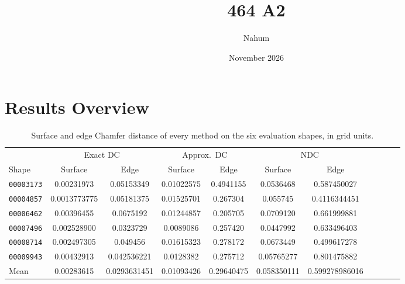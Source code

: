 \documentclass[12pt,letterpaper]{article}
\title{464 A2}
\author{Nahum }
\date{November 2026}
\begin{document}
\section*{Results Overview}

\begin{table}[h]
      \centering
      \footnotesize
      \setlength{\tabcolsep}{5pt}
      \caption{Surface and edge Chamfer distance of every method on the six evaluation shapes, in grid units.}
      \label{tab:overview}
      \begin{tabular}{lcccccccccc}
            \toprule
                              & \multicolumn{2}{c}{Exact DC} & \multicolumn{2}{c}{Approx.\ DC} & \multicolumn{2}{c}{NDC}                                          \\
            \cmidrule(lr){2-3} \cmidrule(lr){4-5} \cmidrule(lr){6-7} 
            Shape             & Surface                      & Edge                            & Surface                 & Edge                    & Surface                        & Edge  \\
            \midrule
            \texttt{00003173} &0.00231973&0.05153349&0.01022575&0.4941155&0.0536468&0.587450027\\
            \texttt{00004857} &0.0013773775&0.05181375&0.01525701&0.267304&0.055745&0.4116344451\\
            \texttt{00006462} &0.00396455&0.0675192&0.01244857&0.205705&0.0709120&0.661999881\\
            \texttt{00007496} &0.002528900&0.0323729&0.0089086&0.257420&0.0447992&0.633496403\\
            \texttt{00008714} &0.002497305& 0.049456&0.01615323&0.278172&0.0673449&0.499617278\\
            \texttt{00009943} &0.00432913&0.042536221& 0.0128382&0.275712&0.05765277&0.801475882\\
            \midrule
            Mean              &0.00283615&0.0293631451&0.01093426&0.29640475&0.058350111&0.599278986016&         &      &         &      \\
            \bottomrule
      \end{tabular}
\end{table}
\end{document}
